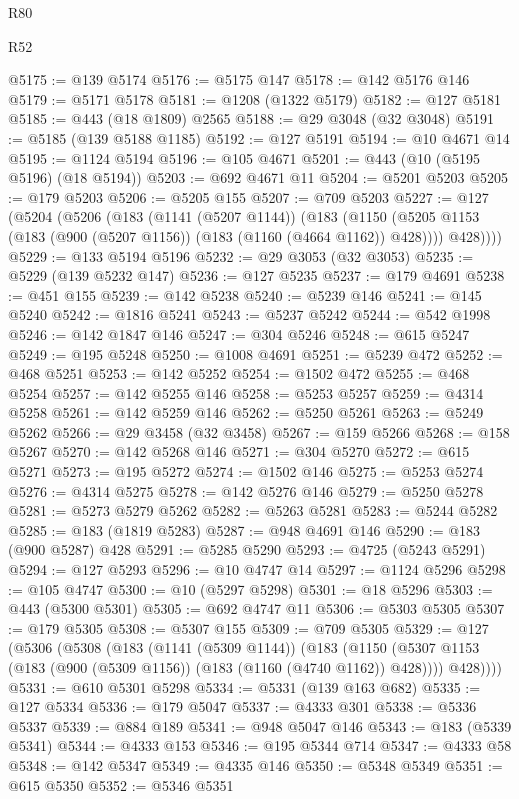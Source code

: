 \begin{lexlean}{R80}
\begin{lexlean}{R52}
\begin{coremodule}
{{{{{{{{{{{{{{{{{{{{{{{{{{{{{{{{{{{{{{{{{{{{{{{{{{{{{{{{{{{{{{{{{{{{{{{{{{{{{{{{{{{{{{{{{{{{{{{{{{{{{{{{{{{{{{{{{{{{{{{{{{{{{{{{{{{{{{{{{{{{{{{{{{{{{{{{{{{{{{{{{{{{{{{{{{{{{{{{{{{{{{{{{{{{{{{{{{{{{{@5175 := @139 @5174
@5176 := @5175 @147
@5178 := @142 @5176 @146
@5179 := @5171 @5178
@5181 := @1208 (@1322 @5179)
@5182 := @127 @5181
@5185 := @443 (@18 @1809) @2565
@5188 := @29 @3048 (@32 @3048)
@5191 := @5185 (@139 @5188 @1185)
@5192 := @127 @5191
@5194 := @10 @4671 @14
@5195 := @1124 @5194
@5196 := @105 @4671
@5201 := @443 (@10 (@5195 @5196) (@18 @5194))
@5203 := @692 @4671 @11
@5204 := @5201 @5203
@5205 := @179 @5203
@5206 := @5205 @155
@5207 := @709 @5203
@5227 := @127
    (@5204
      (@5206
        (@183
          (@1141 (@5207 @1144))
          (@183
            (@1150 (@5205 @1153 (@183 (@900 (@5207 @1156)) (@183 (@1160 (@4664 @1162)) @428))))
            @428))))
@5229 := @133 @5194 @5196
@5232 := @29 @3053 (@32 @3053)
@5235 := @5229 (@139 @5232 @147)
@5236 := @127 @5235
@5237 := @179 @4691
@5238 := @451 @155
@5239 := @142 @5238
@5240 := @5239 @146
@5241 := @145 @5240
@5242 := @1816 @5241
@5243 := @5237 @5242
@5244 := @542 @1998
@5246 := @142 @1847 @146
@5247 := @304 @5246
@5248 := @615 @5247
@5249 := @195 @5248
@5250 := @1008 @4691
@5251 := @5239 @472
@5252 := @468 @5251
@5253 := @142 @5252
@5254 := @1502 @472
@5255 := @468 @5254
@5257 := @142 @5255 @146
@5258 := @5253 @5257
@5259 := @4314 @5258
@5261 := @142 @5259 @146
@5262 := @5250 @5261
@5263 := @5249 @5262
@5266 := @29 @3458 (@32 @3458)
@5267 := @159 @5266
@5268 := @158 @5267
@5270 := @142 @5268 @146
@5271 := @304 @5270
@5272 := @615 @5271
@5273 := @195 @5272
@5274 := @1502 @146
@5275 := @5253 @5274
@5276 := @4314 @5275
@5278 := @142 @5276 @146
@5279 := @5250 @5278
@5281 := @5273 @5279 @5262
@5282 := @5263 @5281
@5283 := @5244 @5282
@5285 := @183 (@1819 @5283)
@5287 := @948 @4691 @146
@5290 := @183 (@900 @5287) @428
@5291 := @5285 @5290
@5293 := @4725 (@5243 @5291)
@5294 := @127 @5293
@5296 := @10 @4747 @14
@5297 := @1124 @5296
@5298 := @105 @4747
@5300 := @10 (@5297 @5298)
@5301 := @18 @5296
@5303 := @443 (@5300 @5301)
@5305 := @692 @4747 @11
@5306 := @5303 @5305
@5307 := @179 @5305
@5308 := @5307 @155
@5309 := @709 @5305
@5329 := @127
    (@5306
      (@5308
        (@183
          (@1141 (@5309 @1144))
          (@183
            (@1150 (@5307 @1153 (@183 (@900 (@5309 @1156)) (@183 (@1160 (@4740 @1162)) @428))))
            @428))))
@5331 := @610 @5301 @5298
@5334 := @5331 (@139 @163 @682)
@5335 := @127 @5334
@5336 := @179 @5047
@5337 := @4333 @301
@5338 := @5336 @5337
@5339 := @884 @189
@5341 := @948 @5047 @146
@5343 := @183 (@5339 @5341)
@5344 := @4333 @153
@5346 := @195 @5344 @714
@5347 := @4333 @58
@5348 := @142 @5347
@5349 := @4335 @146
@5350 := @5348 @5349
@5351 := @615 @5350
@5352 := @5346 @5351
}}}}}}}}}}}}}}}}}}}}}}}}}}}}}}}}}}}}}}}}}}}}}}}}}}}}}}}}}}}}}}}}}}}}}}}}}}}}}}}}}}}}}}}}}}}}}}}}}}}}}}}}}}}}}}}}}}}}}}}}}}}}}}}}}}}}}}}}}}}}}}}}}}}}}}}}}}}}}}}}}}}}}}}}}}}}}}}}}}}}}}}}}}}}}}}}}}}}}}
\end{coremodule}
\end{lexlean}
\end{lexlean}
